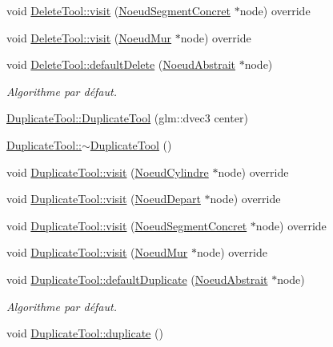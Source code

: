 \begin{DoxyCompactItemize}
\item 
void \hyperlink{group__inf2990_ga1908b4ee57bb2dfbf4022412b48470d8}{Delete\+Tool\+::visit} (\hyperlink{class_noeud_segment_concret}{Noeud\+Segment\+Concret} $\ast$node) override
\item 
void \hyperlink{group__inf2990_ga816147276bc393b0552e031441541726}{Delete\+Tool\+::visit} (\hyperlink{class_noeud_mur}{Noeud\+Mur} $\ast$node) override
\item 
void \hyperlink{group__inf2990_gab16541bc54ef7e060c56d59d64798805}{Delete\+Tool\+::default\+Delete} (\hyperlink{class_noeud_abstrait}{Noeud\+Abstrait} $\ast$node)
\begin{DoxyCompactList}\small\item\em Algorithme par défaut. \end{DoxyCompactList}\item 
\hyperlink{group__inf2990_ga13dd0524e005f4a44dbaeea9f237d761}{Duplicate\+Tool\+::\+Duplicate\+Tool} (glm\+::dvec3 center)
\item 
\hyperlink{group__inf2990_gaab141bc62b424e5e0bfc48bd899bcb8a}{Duplicate\+Tool\+::$\sim$\+Duplicate\+Tool} ()
\item 
void \hyperlink{group__inf2990_gab91de27487440694048c1a0fbcc74da7}{Duplicate\+Tool\+::visit} (\hyperlink{class_noeud_cylindre}{Noeud\+Cylindre} $\ast$node) override
\item 
void \hyperlink{group__inf2990_ga5fa8bbf01a90c95062c8104ebdf5bb62}{Duplicate\+Tool\+::visit} (\hyperlink{class_noeud_depart}{Noeud\+Depart} $\ast$node) override
\item 
void \hyperlink{group__inf2990_gaa8f5663adbfe6f00a2c2f79083339e30}{Duplicate\+Tool\+::visit} (\hyperlink{class_noeud_segment_concret}{Noeud\+Segment\+Concret} $\ast$node) override
\item 
void \hyperlink{group__inf2990_ga9b9e4456490e59603f3d8924fdf19c18}{Duplicate\+Tool\+::visit} (\hyperlink{class_noeud_mur}{Noeud\+Mur} $\ast$node) override
\item 
void \hyperlink{group__inf2990_ga4708caab32b10170d24dba25d4829677}{Duplicate\+Tool\+::default\+Duplicate} (\hyperlink{class_noeud_abstrait}{Noeud\+Abstrait} $\ast$node)
\begin{DoxyCompactList}\small\item\em Algorithme par défaut. \end{DoxyCompactList}\item 
\hypertarget{group__inf2990_gadbe76417e934ddabc6df18141162fe2c}{}void \hyperlink{group__inf2990_gadbe76417e934ddabc6df18141162fe2c}{Duplicate\+Tool\+::duplicate} ()\label{group__inf2990_gadbe76417e934ddabc6df18141162fe2c}


\end{DoxyCompactItemize}
